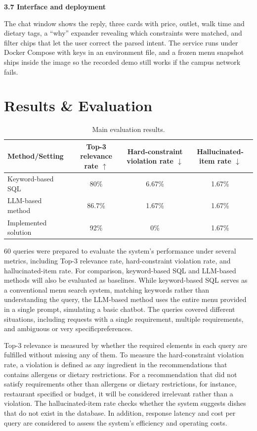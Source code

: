 \documentclass{article}
\begin{document}
\textbf{3.7 Interface and deployment}

 The chat window shows the reply, three cards with price, outlet, walk time and dietary tags, a ``why'' expander revealing which constraints were matched, and filter chips that let the user correct the parsed intent. The service runs under Docker Compose with keys in an environment file, and a frozen menu snapshot ships inside the image so the recorded demo still works if the campus network fails.


\section{Results \& Evaluation}
\begin{table}[H]
  \centering
  \caption{Main evaluation results.}
  \label{tab:main-results}
  \begin{tabular}{lccc}
    \toprule
    Method/Setting & Top-3 relevance rate $\uparrow$ & Hard-constraint violation rate $\downarrow$ & Hallucinated-item rate $\downarrow$\\
    \midrule
    Keyword-based SQL & 80\% & 6.67\% & 1.67\% \\
    LLM-based method & 86.7\% & 1.67\% & 1.67\% \\
    Implemented solution & 92\% & 0\% & 1.67\% \\
    \bottomrule
  \end{tabular}
\end{table}

60 queries were prepared to evaluate the system's performance under several metrics, including Top-3 relevance rate, hard-constraint violation rate, and hallucinated-item rate. For comparison, keyword-based SQL and LLM-based methods will also be evaluated as baselines. While keyword-based SQL serves as a conventional menu search system, matching keywords rather than understanding the query, the LLM-based method uses the entire menu provided in a single prompt, simulating a basic chatbot. The queries covered different situations, including requests with a single requirement, multiple requirements, and ambiguous or very specificpreferences. 

Top-3 relevance is measured by whether the required elements in each query are fulfilled without missing any of them. To measure the hard-constraint violation rate, a violation is defined as any ingredient in the recommendations that contains allergens or dietary restrictions. For a recommendation that did not satisfy requirements other than allergens or dietary restrictions, for instance, restaurant specified or budget, it will be considered irrelevant rather than a violation. The hallucinated-item rate checks whether the system suggests dishes that do not exist in the database. In addition, response latency and cost per query are considered to assess the system's efficiency and operating costs.
\end{document}
